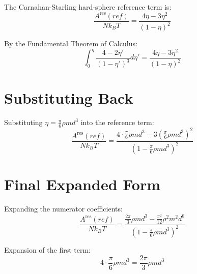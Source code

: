 \begin{definition}
\label{def:cs_reference_term}
\leanok
The Carnahan-Starling hard-sphere reference term is:
$$\frac{A^{\text{res}}(ref)}{Nk_BT} = \frac{4\eta - 3\eta^2}{(1 - \eta)^2}$$
\end{definition}

\begin{theorem}
\label{thm:cs_reference_integral_eq}
\leanok
By the Fundamental Theorem of Calculus:
$$\int_0^\eta \frac{4 - 2\eta'}{(1 - \eta')^3} d\eta' = \frac{4\eta - 3\eta^2}{(1 - \eta)^2}$$
\end{theorem}

\section{Substituting Back}

\begin{theorem}
\label{thm:substitute_packing_density}
\leanok
Substituting $\eta = \frac{\pi}{6}\rho md^3$ into the reference term:
$$\frac{A^{\text{res}}(ref)}{Nk_BT} = \frac{4 \cdot \frac{\pi}{6}\rho md^3 - 3 \left(\frac{\pi}{6}\rho md^3\right)^2}{\left(1 - \frac{\pi}{6}\rho md^3\right)^2}$$
\end{theorem}

\section{Final Expanded Form}

\begin{definition}
\label{def:expanded_cs_reference_term}
\leanok
Expanding the numerator coefficients:
$$\frac{A^{\text{res}}(ref)}{Nk_BT} = \frac{\frac{2\pi}{3}\rho md^3 - \frac{\pi^2}{12}\rho^2 m^2 d^6}{\left(1 - \frac{\pi}{6}\rho md^3\right)^2}$$
\end{definition}

\begin{theorem}
\label{thm:four_eta_expansion}
\leanok
Expansion of the first term:
$$4 \cdot \frac{\pi}{6}\rho md^3 = \frac{2\pi}{3}\rho md^3$$
\end{theorem}

